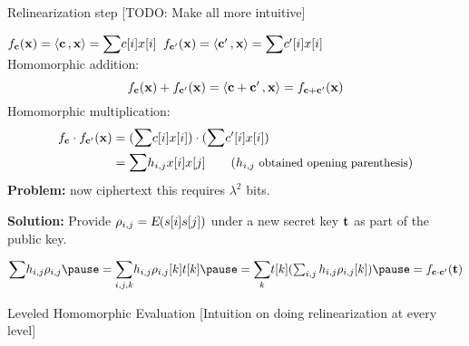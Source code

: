 \def\c{\vect{c}}
\def\cp{\vect{c'}}
\def\fc{f_{\c}}
\def\fcp{f_{\cp}}
\def\x{\vect{x}}

\begin{frame}{Relinearization step}
[TODO: Make all more intuitive]

 $  \fc(\x) = \inprod{\c}{\vect{x}} = \Sum c[i] x[i]$ \quad\quad\quad
 $  \fcp(\x) = \inprod{\cp}{\vect{x}} = \Sum c'[i] x[i]$
  \pause\\
 \medskip
 Homomorphic addition:
$$ \fc(\x)+\fcp(\x) = \inprod{\c+\cp}{\vect{x}}  = f_{\c+\cp}(\x) $$ 
\medskip 
\pause
Homomorphic multiplication:
 \begin{align*}
 \fc\cdot\fcp(\x)  & =   (\Sum c[i] x[i]) \cdot (\Sum c'[i]x[i]) \\
        				 & =  \Sum h_{i,j} x[i]x[j]   \quad\quad \small{( h_{i,j} \text{ obtained opening parenthesis})}
\end{align*}
\pause
\textbf{Problem:} now ciphertext this requires $\lambda^2$ bits.\pause

\textbf{Solution:} Provide $\mathbf{\rho}_{i,j} = {\textsl{E}}(s[i]s[j])$ under a new secret key $\mathbf{t}$ as part of the public key.\pause
 
$
  \Sum h_{i,j} \vect{\rho}_{i,j}\pause  %
=  \Sum_{i,j,k} h_{i,j} \rho_{i,j}[k] t[k] \pause = \Sum_k t[k](\sum_{i,j} h_{i,j} \rho_{i,j}[k])\pause = f_{\c\cdot\cp}(\vect{t})
$
 
\end{frame}

\begin{frame}{Leveled Homomorphic Evaluation}
	[Intuition on doing relinearization at every level]
\end{frame}